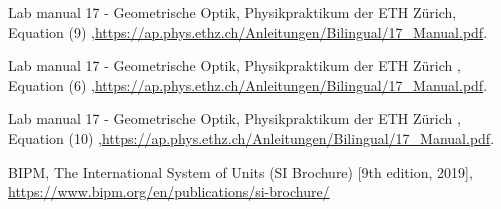 
\begin{thebibliography}{99}




Lab manual 17 - Geometrische Optik, Physikpraktikum der ETH Zürich, Equation (9) ,\url{https://ap.phys.ethz.ch/Anleitungen/Bilingual/17_Manual.pdf}.

Lab manual 17 - Geometrische Optik, Physikpraktikum der ETH Zürich , Equation (6) ,\url{https://ap.phys.ethz.ch/Anleitungen/Bilingual/17_Manual.pdf}.

Lab manual 17 - Geometrische Optik, Physikpraktikum der ETH Zürich , Equation (10) ,\url{https://ap.phys.ethz.ch/Anleitungen/Bilingual/17_Manual.pdf}.


BIPM, The International System of Units (SI Brochure) [9th edition, 2019],
\url{https://www.bipm.org/en/publications/si-brochure/}
\end{thebibliography}

